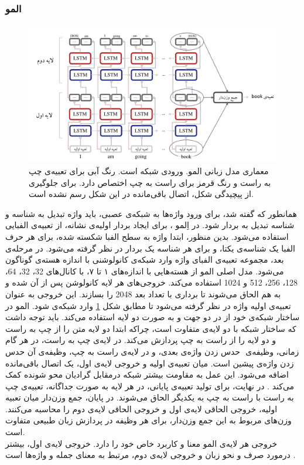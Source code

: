 \subsubsection{المو}
\begin{figure}[!htb]
	\centering
	\includegraphics[scale=0.65]{Figures/elmo.pdf}
	\caption[معماری مدل زبانی المو]{معماری مدل زبانی المو. ورودی شبکه  است. رنگ آبی برای  تعبیه‌ی چپ به راست و رنگ قرمز برای راست به چپ اختصاص دارد. برای جلوگیری از پیچیدگی شکل، اتصال باقی‌مانده در این شکل رسم نشده است.}
	\label{Fig:elmo}
\end{figure}
همانطور که گفته شد، برای ورود واژه‌ها به شبکه‌ی عصبی، باید واژه تبدیل به شناسه و شناسه تبدیل به بردار شود. در اِلمو ، برای ایجاد بردار اولیه‌ی نشانه، از تعبیه‌ی الفبایی استفاده می‌شود. بدین منظور، ابتدا واژه به سطح الفبا شکسته شده، برای هر حرف الفبا یک شناسه‌ی یکتا، و برای هر شناسه یک بردار در نظر گرفته می‌شود. در مرحله‌ی بعد، مجموعه تعبیه‌ی الفبای واژه وارد شبکه‌ی کانولوشنی با اندازه هسته‌ی گوناگون می‌شود. مدل اصلی المو از هسته‌هایی با اندازه‌های ۱ تا ۷، با کانال‌های 32، 32، 64، 128، 256، 512 و 1024 استفاده می‌کند. خروجی‌های هر لایه کانولوشن پس از آن  شده و به هم الحاق می‌شوند تا برداری با تعداد بعد 2048 را بسازند. این خروجی به عنوان تعبیه‌ی اولیه واژه در نظر گرفته می‌شود تا مطابق شکل \ref{Fig:elmo} وارد شبکه‌ی  شود. المو در ساختار شبکه‌ی خود از  در دو جهت و به صورت دو لایه استفاده می‌کند. باید توجه داشت که ساختار شبکه با دو لایه‌ی  متفاوت است، چراکه ابتدا دو لایه متن را از چپ به راست و دو لایه را از راست به چپ پردازش می‌کند. در لایه‌ی چپ به راست،  در هر گام زمانی، وظیفه‌ی ‌ حدس زدن واژه‌ی بعدی، و در لایه‌ی راست به چپ، وظیفه‌ی آن حدس زدن واژه‌ی پیشین است. میان تعبیه‌ی اولیه و خروجی لایه‌ی اول، یک اتصال باقی‌مانده اضافه می‌شود. این عمل به مقاومت بیشتر شبکه درمقابل گرادیان محو شونده کمک می‌کند \cite{residualconnection}. در نهایت، برای تولید تعبیه‌ی پایانی، در هر لایه به صورت جداگانه، تعبیه‌ی چپ به راست با راست به چپ به یکدیگر الحاق می‌شوند. در پایان، جمع وزن‌دار میان تعبیه اولیه، خروجی الحاقی لایه‌ی اول و خروجی الحاقی لایه‌ی دوم را محاسبه می‌کنند. وزن‌های مربوط به این جمع وزن‌دار، برای هر وظیفه در پردازش زبان طبیعی متفاوت است.\\ خروجی هر لایه‌ی المو معنا و کاربرد خاص خود را دارد. خروجی لایه‌ی اول، بیشتر درمورد صرف و نحو زبان و خروجی لایه‌ی دوم، مرتبط به معنای جمله و واژه‌ها است \cite{elmo}.

